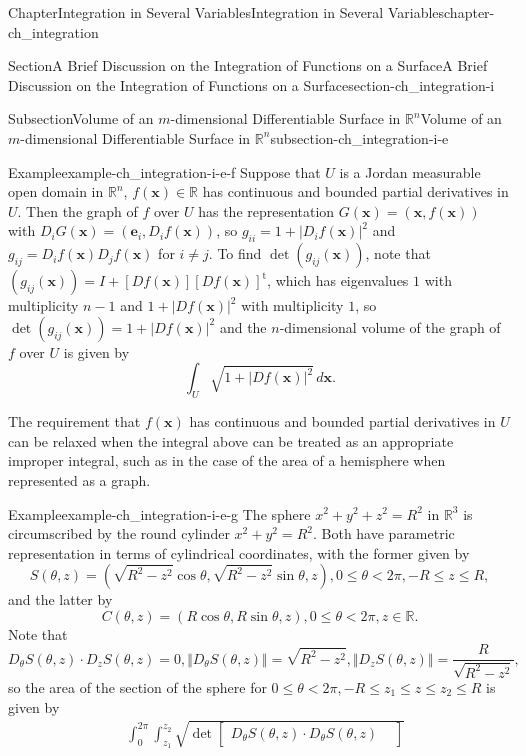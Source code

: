 \documentclass[oneside,10pt,]{book}
\numberwithin{equation}{section}
\newcommand{\be}{\mathbf{e}}
\newcommand{\bx}{\mathbf{x}}
\newcommand{\bbR}{\mathbb{R}}
\newcommand{\lt}{<}
\newcommand{\amp}{&}
\begin{document}
\begin{chapterptx}{Chapter}{Integration in Several Variables}{}{Integration in Several Variables}{}{}{chapter-ch_integration}
\begin{sectionptx}{Section}{A Brief Discussion on the Integration of Functions on a Surface}{}{A Brief Discussion on the Integration of Functions on a Surface}{}{}{section-ch_integration-i}
\begin{subsectionptx}{Subsection}{Volume of an \(m\)-dimensional Differentiable Surface in \(\bbR^{n}\)}{}{Volume of an \(m\)-dimensional Differentiable Surface in \(\bbR^{n}\)}{}{}{subsection-ch_integration-i-e}
\begin{example}{Example}{}{example-ch_integration-i-e-f}%
Suppose that \(U\) is a Jordan measurable open domain in \(\bbR^{n}\), \(f(\bx)\in \bbR\) has continuous and bounded partial derivatives in \(U\). Then the graph of \(f\) over \(U\) has the representation \(G(\bx)=(\bx, f(\bx))\) with \(D_{i}G(\bx)=(\be_{i}, D_{i}f(\bx))\), so \(g_{ii}=1+|D_{i}f(\bx)|^{2}\) and \(g_{ij}=D_{i}f(\bx) D_{j}f(\bx)\) for \(i\ne j\). To find \(\det (g_{ij}(\bx))\), note that \((g_{ij}(\bx))=I +[Df(\bx)][Df(\bx)]^{\mathrm t}\), which has eigenvalues \(1\) with multiplicity \(n-1\) and \(1+|Df(\bx)|^{2}\) with multiplicity \(1\), so \(\det (g_{ij}(\bx))= 1+|Df(\bx)|^{2}\) and the \(n\)-dimensional volume of the graph of \(f\) over \(U\) is given  by%
\begin{equation*}
\int_{U} \sqrt{1+|Df(\bx)|^{2}}\, d\bx.
\end{equation*}
%
\par
The requirement that \(f(\bx)\) has continuous and bounded partial derivatives in \(U\) can be relaxed when the integral above can be treated as an appropriate improper integral, such as in the case of the area of a hemisphere when represented as a graph.%
\end{example}
\begin{example}{Example}{}{example-ch_integration-i-e-g}%
The  sphere \(x^{2}+y^{2}+z^{2}=R^{2}\) in \(\bbR^{3}\) is circumscribed by the round cylinder \(x^{2}+y^{2}=R^{2}\). Both have parametric representation in terms of cylindrical coordinates, with the former given by%
\begin{equation*}
S(\theta, z)=(\sqrt{R^{2}-z^{2}} \cos\theta, \sqrt{R^{2}-z^{2}} \sin \theta, z), 0\le \theta \lt 2\pi, -R\le z \le R,
\end{equation*}
and the latter by%
\begin{equation*}
C(\theta, z)=(R\cos \theta, R\sin\theta, z), 0\le \theta \lt 2\pi, z\in \bbR.
\end{equation*}
Note that%
\begin{equation*}
D_{\theta}S(\theta, z)\cdot D_{z}S(\theta, z)=0, \Vert D_{\theta}S(\theta, z)\Vert =\sqrt{R^{2}-z^{2}},
\Vert D_{z}S(\theta, z)\Vert=\frac{R}{\sqrt{R^{2}-z^{2}}},
\end{equation*}
so the area of the section of the sphere for \(0\le \theta \lt 2\pi, -R\le z_{1}\le z \le z_{2}\le R\) is given by%
\begin{align*}
\amp \int_{0}^{2\pi} \int_{z_{1}}^{z_{2}} \sqrt{\det \begin{bmatrix} D_{\theta}S(\theta, z)\cdot D_{\theta}S(\theta, z) \amp

\end{bmatrix}}
\end{align*}
\end{example}
\end{subsectionptx}
\end{sectionptx}
\end{chapterptx}
\end{document}
